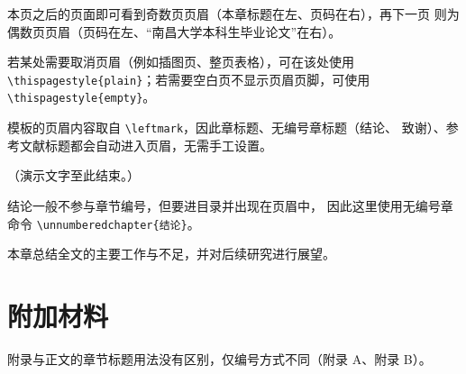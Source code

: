 \documentclass[official]{ncubachelor}
\begin{document}
本页之后的页面即可看到奇数页页眉（本章标题在左、页码在右），再下一页
则为偶数页页眉（页码在左、“南昌大学本科生毕业论文”在右）。

若某处需要取消页眉（例如插图页、整页表格），可在该处使用
\verb|\thispagestyle{plain}|；若需要空白页不显示页眉页脚，可使用
\verb|\thispagestyle{empty}|。

模板的页眉内容取自 \verb|\leftmark|，因此章标题、无编号章标题（结论、
致谢）、参考文献标题都会自动进入页眉，无需手工设置。

（演示文字至此结束。）


\zhlipsum[3-7]

结论一般不参与章节编号，但要进目录并出现在页眉中，
因此这里使用无编号章命令 \verb|\unnumberedchapter{结论}|。

本章总结全文的主要工作与不足，并对后续研究进行展望。

\appendix
\chapter{附加材料}\label{chap:appendix}

附录与正文的章节标题用法没有区别，仅编号方式不同（附录 A、附录 B）。

\backmatter

\zhlipsum[3-5]

\printbibliography

\begin{acknowledgements}
\zhlipsum[3,5]
\end{acknowledgements}
\end{document}
